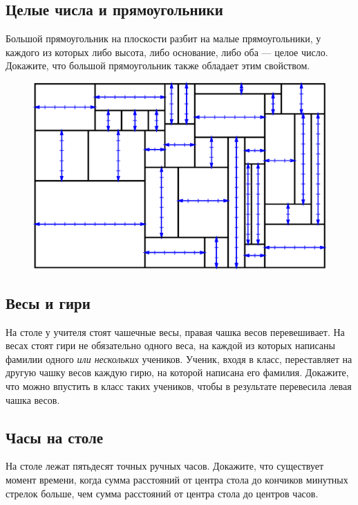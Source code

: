 \subsection*{Целые числа и прямоугольники} %

Большой прямоугольник на плоскости разбит на малые прямоугольники, у каждого из которых либо высота, либо основание, либо оба --- целое число. 
Докажите, что большой прямоугольник также обладает этим свойством.

\begin{figure}[h!]
\centering
\includegraphics[scale=0.6]{Figs/Insight/rect}
\end{figure}

\subsection*{Весы и гири} %

На столе у учителя стоят чашечные весы, правая чашка весов перевешивает.
На весах стоят гири не обязательно одного веса, на каждой из которых написаны фамилии одного \emph{или нескольких} учеников.
Ученик, входя в класс, переставляет на другую чашку весов каждую гирю, на которой написана его фамилия.
Докажите, что можно впустить в класс таких учеников, чтобы в результате перевесила левая чашка весов.

\subsection*{Часы на столе} %

На столе лежат пятьдесят точных ручных часов.
Докажите, что существует момент времени, когда сумма расстояний от центра стола до кончиков минутных стрелок больше, чем сумма расстояний от центра стола до центров часов.


